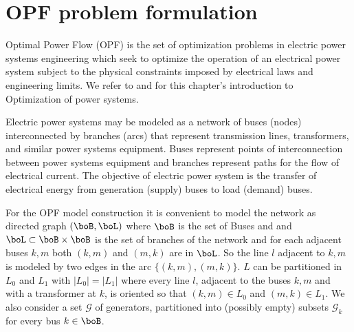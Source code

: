 \documentclass[11pt,a4paper,oneside,openany]{book}
\numberwithin{definition}{section}
\numberwithin{theorem}{section}
\numberwithin{problem}{section}
\begin{document}
\chapter{OPF problem formulation} 
Optimal Power Flow (OPF) is the set of optimization problems in electric power systems engineering which seek to optimize the operation of an electrical power system subject to the physical constraints imposed by electrical laws and engineering limits. We refer to \cite{IntroOPF} and \cite{MathProgForm} for this chapter's introduction to Optimization of power systems. 


 Electric power systems may be modeled as a network of buses (nodes) interconnected by branches (arcs) that represent transmission lines, transformers, and similar power systems equipment. Buses represent points of interconnection between power systems equipment and branches represent paths for the flow of electrical current. The objective of electric power system is the transfer of electrical energy from generation (supply) buses to load (demand) buses. 

 For the OPF model construction it is convenient to model the network as directed graph $(\boB,\boL)$ where $\boB$ is the set of Buses and and $\boL \subset \boB \times \boB$ is the set of branches of the network and for each adjacent buses $k,m$ both $(k,m)$ and $(m,k)$ are in $\boL$. So the line $l$ adjacent to $k,m$ is modeled by two edges in the arc $\{(k,m),(m,k)\}$. $L$ can be partitioned in $L_0$ and $L_1$ with $|L_0|=|L_1|$ where every line $l$, adjacent to the buses $k,m$ and with a transformer at $k$, is oriented so that $(k,m) \in L_0$ and $(m,k) \in L_1$. We also consider a set $\mathcal{G}$ of generators, partitioned into (possibly empty) subsets $\mathcal{G}_k$ for every bus $k \in \boB$.
\end{document}

